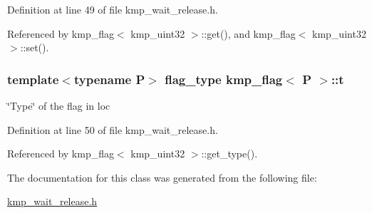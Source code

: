 Definition at line 49 of file kmp\-\_\-wait\-\_\-release.\-h.



Referenced by kmp\-\_\-flag$<$ kmp\-\_\-uint32 $>$\-::get(), and kmp\-\_\-flag$<$ kmp\-\_\-uint32 $>$\-::set().

\hypertarget{classkmp__flag_aebad8727c9520d1bb2b2219c94cb3c62}{
\subsubsection[{t}]{\setlength{\rightskip}{0pt plus 5cm}template$<$typename P$>$ {\bf flag\-\_\-type} {\bf kmp\-\_\-flag}$<$ P $>$\-::t\hspace{0.3cm}{\ttfamily [private]}}}\label{classkmp__flag_aebad8727c9520d1bb2b2219c94cb3c62}
\char`\"{}\-Type\char`\"{} of the flag in loc 

Definition at line 50 of file kmp\-\_\-wait\-\_\-release.\-h.



Referenced by kmp\-\_\-flag$<$ kmp\-\_\-uint32 $>$\-::get\-\_\-type().



The documentation for this class was generated from the following file\-:\begin{DoxyCompactItemize}
\item 
\hyperlink{kmp__wait__release_8h}{kmp\-\_\-wait\-\_\-release.\-h}\end{DoxyCompactItemize}
